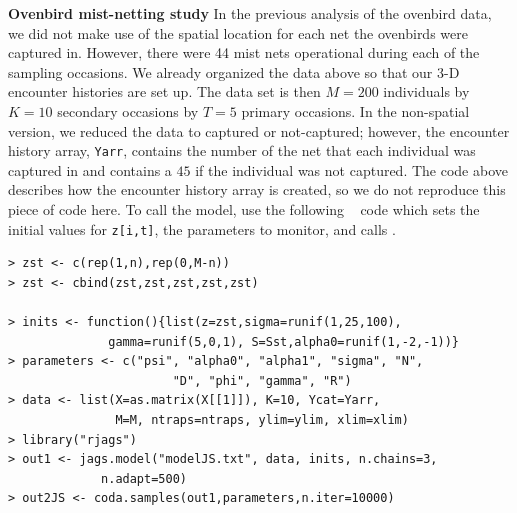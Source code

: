 {\flushleft \bf Ovenbird mist-netting study}
In the previous analysis of the ovenbird data, we did not make use of
the spatial location for each net the ovenbirds were captured in.
However, there were 44 mist nets operational during each of the
sampling occasions.  We already organized the data above so that our
3-D encounter histories are set up.  The data set is then $M=200$
individuals by $K=10$ secondary occasions by $T=5$ primary occasions.
In the non-spatial version, we reduced the data to captured or
not-captured; however, the encounter history array, \mbox{\tt Yarr},
contains the number of the net that each individual was captured in
and contains a $45$ if the individual was not captured. The code above describes how the encounter
history array is created, so we
do not reproduce this piece of code here. To call the model, use the following
\R~ code which sets the initial values for \mbox{\tt z[i,t]}, the parameters to
monitor, and calls \jags.

{\small 
\begin{verbatim}
> zst <- c(rep(1,n),rep(0,M-n))
> zst <- cbind(zst,zst,zst,zst,zst)

> inits <- function(){list(z=zst,sigma=runif(1,25,100),
              gamma=runif(5,0,1), S=Sst,alpha0=runif(1,-2,-1))}
> parameters <- c("psi", "alpha0", "alpha1", "sigma", "N",
                       "D", "phi", "gamma", "R")
> data <- list(X=as.matrix(X[[1]]), K=10, Ycat=Yarr,
               M=M, ntraps=ntraps, ylim=ylim, xlim=xlim)
> library("rjags")
> out1 <- jags.model("modelJS.txt", data, inits, n.chains=3,
             n.adapt=500)
> out2JS <- coda.samples(out1,parameters,n.iter=10000)
\end{verbatim}
}


